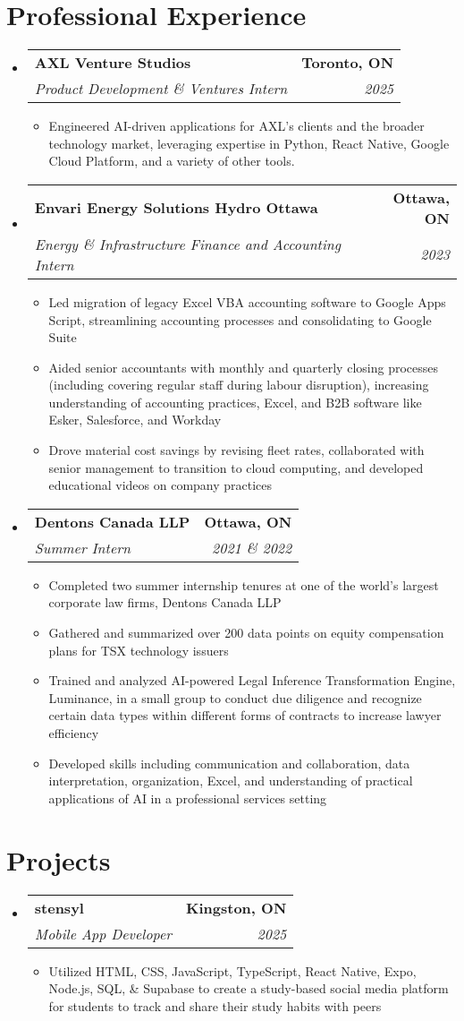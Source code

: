\documentclass[letterpaper,10pt]{article}
\makeatletter
\newcommand{\resumeItem}[1]{
  \item\small{
    {#1 \vspace{-2pt}}
  }
}
\newcommand{\resumeSubheading}[4]{
  \vspace{-2pt}\item
    \begin{tabular*}{1.0\textwidth}[t]{l@{\extracolsep{\fill}}r}
      \textbf{#1} & \textbf{\small #2} \\
      \textit{\small#3} & \textit{\small #4} \\
    \end{tabular*}\vspace{-7pt}
}
\newcommand{\resumeSubHeadingListStart}{\begin{itemize}[leftmargin=0.0in, label={}]}
\newcommand{\resumeSubHeadingListEnd}{\end{itemize}}
\newcommand{\resumeItemListStart}{\begin{itemize}[label=--]}
\newcommand{\resumeItemListEnd}{\end{itemize}\vspace{-5pt}}
\makeatother
\begin{document}
\section{Professional Experience}
  \resumeSubHeadingListStart
    \resumeSubheading
      {AXL Venture Studios}{Toronto, ON}
      {Product Development \& Ventures Intern}{2025}
      \resumeItemListStart
        \resumeItem{Engineered AI-driven applications for AXL's clients and the broader technology market, leveraging expertise in Python, React Native, Google Cloud Platform, and a variety of other tools.}
      \resumeItemListEnd
    \resumeSubheading
      {Envari Energy Solutions \textbar{} Hydro Ottawa}{Ottawa, ON}
      {Energy \& Infrastructure Finance and Accounting Intern}{2023}
      \resumeItemListStart
        \resumeItem{Led migration of legacy Excel VBA accounting software to Google Apps Script, streamlining accounting processes and consolidating to Google Suite}
        \resumeItem{Aided senior accountants with monthly and quarterly closing processes (including covering regular staff during labour disruption), increasing understanding of accounting practices, Excel, and B2B software like Esker, Salesforce, and Workday}
        \resumeItem{Drove material cost savings by revising fleet rates, collaborated with senior management to transition to cloud computing, and developed educational videos on company practices}
      \resumeItemListEnd
    \resumeSubheading
      {Dentons Canada LLP}{Ottawa, ON}
      {Summer Intern}{2021 \& 2022}
      \resumeItemListStart
        \resumeItem{Completed two summer internship tenures at one of the world's largest corporate law firms, Dentons Canada LLP}
        \resumeItem{Gathered and summarized over 200 data points on equity compensation plans for TSX technology issuers}
        \resumeItem{Trained and analyzed AI-powered Legal Inference Transformation Engine, Luminance, in a small group to conduct due diligence and recognize certain data types within different forms of contracts to increase lawyer efficiency}
        \resumeItem{Developed skills including communication and collaboration, data interpretation, organization, Excel, and understanding of practical applications of AI in a professional services setting}
      \resumeItemListEnd
  \resumeSubHeadingListEnd

\section{Projects}
    \resumeSubHeadingListStart
      \resumeSubheading
          {stensyl}{Kingston, ON}
          {Mobile App Developer}{2025}
          \resumeItemListStart
            \resumeItem{Utilized HTML, CSS, JavaScript, TypeScript, React Native, Expo, Node.js, SQL, \& Supabase to create a study-based social media platform for students to track and share their study habits with peers}
          \resumeItemListEnd
    \resumeSubHeadingListEnd
\end{document}
